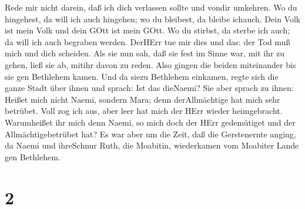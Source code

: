 Rede mir nicht darein, daß ich dich verlassen sollte und vondir
umkehren. Wo du hingehest, da will ich auch hingehen; wo du bleibest, da
bleibe ichauch. Dein Volk ist mein Volk und dein GOtt ist mein GOtt.
 Wo du stirbst, da sterbe ich auch; da will ich auch
begraben werden. DerHErr tue mir dies und das: der Tod muß mich und dich
scheiden.  Als sie nun sah, daß sie fest im Sinne war, mit
ihr zu gehen, ließ sie ab, mitihr davon zu reden.  Also
gingen die beiden miteinander bis sie gen Bethlehem kamen. Und da siezu
Bethlehem einkamen, regte sich die ganze Stadt über ihnen und sprach:
Ist das dieNaemi?  Sie aber sprach zu ihnen: Heißet mich
nicht Naemi, sondern Mara; denn derAllmächtige hat mich sehr betrübet.
 Voll zog ich aus, aber leer hat mich der HErr wieder
heimgebracht. Warumheißet ihr mich denn Naemi, so mich doch der HErr
gedemütiget und der Allmächtigebetrübet hat?  Es war aber
um die Zeit, daß die Gerstenernte anging, da Naemi und ihreSchnur Ruth,
die Moabitin, wiederkamen vom Moabiter Lande gen Bethlehem.

\hypertarget{section-1}{%
\section{2}\label{section-1}}

